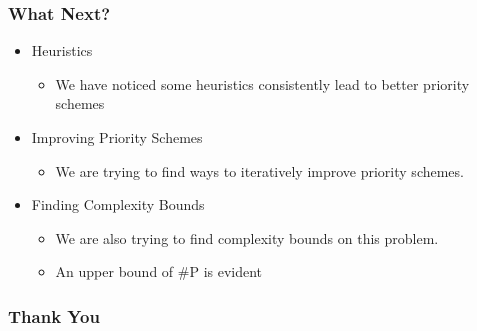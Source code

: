 \documentclass{beamer}
\begin{document}
\begin{frame}
\frametitle{What Next?}
	\begin{itemize}
	\item Heuristics
		\begin{itemize}
		\item We have noticed some heuristics consistently lead to better priority schemes
		\end{itemize}
	\item Improving Priority Schemes
		\begin{itemize}
		\item We are trying to find ways to iteratively improve priority schemes.
		\end{itemize}
	\item Finding Complexity Bounds
		\begin{itemize}
		\item We are also trying to find complexity bounds on this problem.
		\item An upper bound of \#P is evident
		\end{itemize}
	\end{itemize}
\end{frame}


\begin{frame}
\frametitle{Thank You}
\end{frame}
\end{document}
